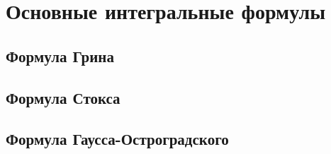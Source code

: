 \chapter{Основные интегральные формулы}
\section{Формула Грина}

\section{Формула Стокса}

\section{Формула Гаусса-Остроградского}
